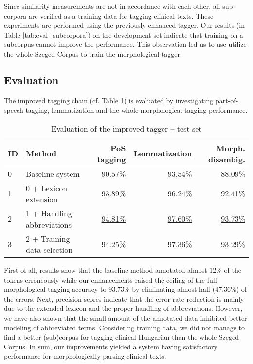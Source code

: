 Since similarity measurements are not in accordance with each other, all sub-corpora are verified as a training data for tagging clinical texts. 
These experiments are performed using the previously enhanced tagger. 
Our results (in Table  \ref{tab:eval_subcorpora}) on the development set indicate that training on a subcorpus cannot improve the performance. %
This observation led us to use utilize the whole Szeged Corpus to train the morphological tagger.

\subsection{Evaluation}

The improved tagging chain (cf. Table \ref{tab:improvements}) is evaluated by investigating part-of-speech tagging, lemmatization and the whole morphological tagging performance.%

\begin{table}[h]
\centering
\caption{Evaluation of the improved tagger -- test set}
\label{tab:improvements}
\begin{tabular}{ l l r r r} 
\hline
ID & Method & PoS tagging & Lemmatization & Morph. disambig. \\
\hline
0 & Baseline system & 90.57\% & 93.54\% & 88.09\% \\
1 & 0 + Lexicon extension & 93.89\% & 96.24\% & 92.41\% \\
2 & 1 + Handling abbreviations & \underline{94.81\%} & \underline{97.60\%} & \underline{93.73\%} \\
3 & 2 + Training data selection & 94.25\% & 97.36\% & 93.29\% \\
\hline
\end{tabular}
\end{table}

First of all, results show that the baseline method annotated almost 12\% of the tokens erroneously while our enhancements raised the ceiling of the full morphological tagging accuracy to 93.73\% by eliminating almost half (47.36\%) of the errors. 
Next, precision scores indicate that the error rate reduction is mainly due to the extended lexicon and the proper handling of abbreviations. 
However, we have also shown that the small amount of the annotated data inhibited better modeling of abbreviated terms.
Considering training data, we did not manage to find a better (sub)corpus for tagging clinical Hungarian than the whole Szeged Corpus. %
In sum, our improvements yielded a system having satisfactory performance for morphologically parsing clinical texts.
